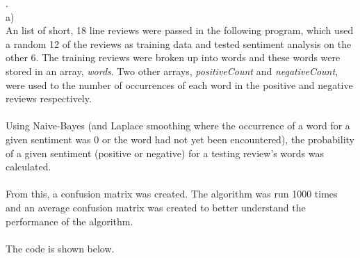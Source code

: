 \documentclass[10pt]{article}
\begin{document}
.\\
a)\\
An list of short, 18 line reviews were passed in the following program, which used a random 12 of the reviews as training data and tested sentiment analysis on the other 6. The training reviews were broken up into words and these words were stored in an array, \textit{words}. Two other arrays, \textit{positiveCount} and \textit{negativeCount}, were used to the number of occurrences of each word in the positive and negative reviews respectively.\\
\\ 
Using Naive-Bayes (and Laplace smoothing where the occurrence of a word for a given sentiment was 0 or the word had not yet been encountered), the probability of a given sentiment (positive or negative) for a testing review's words was calculated.\\
\\
From this, a confusion matrix was created. The algorithm was run 1000 times and an average confusion matrix was created to better understand the performance of the algorithm.\\
\\
The code is shown below.
\end{document}

